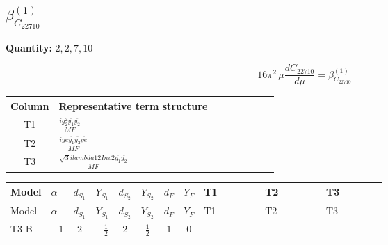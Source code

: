 \documentclass[8pt]{article}
\begin{document}
\begin{landscape}
\section*{$\beta_{C_{22710}}^{(1)}$}
\noindent\textbf{Quantity: }$\mathrm{2,2,7,10}$\par\smallskip
\[16\pi^2\,\mu\frac{d C_{22710}}{d\mu}=\beta_{C_{22710}}^{(1)}\]
\begin{center}
\begin{tabular}{@{}c >{\raggedright\arraybackslash}p{0.82\linewidth}@{}}
\toprule
Column & Representative term structure \\
\midrule
T1 & \(\displaystyle \frac{i g_{2}^{2} \overline{y_{1}} \overline{y_{2}}}{MF}\) \\
\midrule
T2 & \(\displaystyle \frac{i ye \overline{y_{1}} \overline{y_{2}} \overline{ye}}{MF}\) \\
\midrule
T3 & \(\displaystyle \frac{\sqrt{3} i lambda12Inv2 \overline{y_{1}} \overline{y_{2}}}{MF}\) \\
\midrule
\bottomrule
\end{tabular}
\end{center}
\smallskip
\tiny
\begin{longtable}{@{}llcccccc >{\raggedright\arraybackslash}p{0.21\linewidth} >{\raggedright\arraybackslash}p{0.21\linewidth} >{\raggedright\arraybackslash}p{0.21\linewidth}@{}}
\toprule
Model & $\alpha$ & $d_{S_1}$ & $Y_{S_1}$ & $d_{S_2}$ & $Y_{S_2}$ & $d_F$ & $Y_F$ & T1 & T2 & T3 \\
\midrule
\endfirsthead
\toprule
Model & $\alpha$ & $d_{S_1}$ & $Y_{S_1}$ & $d_{S_2}$ & $Y_{S_2}$ & $d_F$ & $Y_F$ & T1 & T2 & T3 \\
\midrule
\endhead
T3-B & $-1$ & $2$ & $-\frac{1}{2}$ & $2$ & $\frac{1}{2}$ & $1$ & $0$ & \scriptsize\adjustbox{max width=\linewidth}{$\begin{gathered} \frac{3 i g_{2}^{2} \overline{y_{1}} \overline{y_{2}}}{4 MF}\end{gathered}$} & \scriptsize\adjustbox{max width=\linewidth}{$\begin{gathered} - \frac{i ye \overline{y_{1}} \overline{y_{2}} \overline{ye}}{4 MF}\end{gathered}$} & \scriptsize\adjustbox{max width=\linewidth}{$\begin{gathered} \frac{\sqrt{3} i lambda12Inv2 \overline{y_{1}} \overline{y_{2}}}{3 MF}\end{gathered}$} \\
\midrule
\bottomrule
\end{longtable}
\clearpage

\end{landscape}
\end{document}
